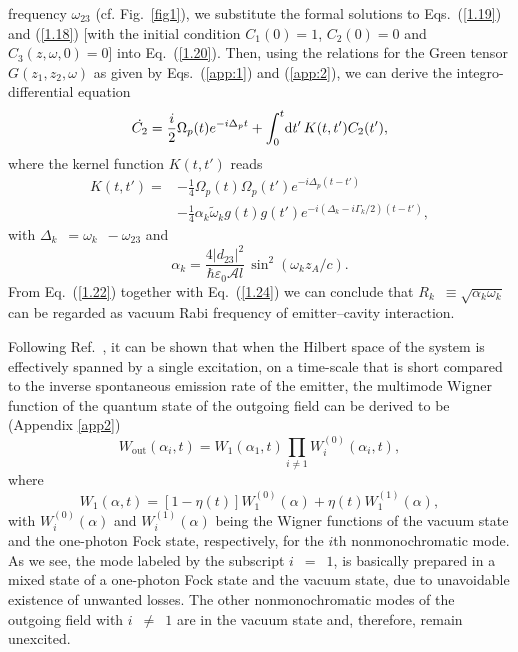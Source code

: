\documentclass[pra, twocolumn]{revtex4}
\newcommand{\D}{\mbox{\rm d}}
\begin{document}
frequency $\omega_{23}$
(cf. Fig.~\ref{fig1}),
we substitute the formal solutions to Eqs.~(\ref{1.19}) and (\ref{1.18})
[with the initial condition \mbox{$C_1(0)=1$}, \mbox{$C_2(0)=0$} and
\mbox{$C_3(z, \omega, 0)=0$}] into  Eq.~(\ref{1.20}).
%
Then, using
%
the
relations for the Green tensor $G(z_1, z_2, \omega)$
as given by
Eqs.~(\ref{app:1}) and (\ref{app:2}),
we can
derive the integro-differential equation
\begin{align}
 \label{1.22}
 \dot {C_2} =
 \frac{i}{2}
\Omega
_p(t)
      e^{-i\Delta_pt}
 +
\int_0^t \! \D t'\,
    K(t,t')
    C_2(t'),
\end{align}
where the kernel function $K(t,t')$ reads
\begin{align}
  \label{1.24}
  K(t,t')=
&
  -\frac{1}{4}
\Omega
_p(t)
\Omega
_p(t')
    e^{-i\Delta_p(t-t')}
\nonumber\\[1ex]&
    -
    \frac{1}{4}
   \alpha_k 
   \tilde{\omega}_k
   g(t)
    g(t')
    e^{-i(\Delta_k - i \Gamma_k/2)(t-t')},
\end{align}
with \mbox{$\Delta_k$ $\!=\omega_k$ $\!-\omega_{23}$} and
\begin{equation}
  \label{1.23}
   \alpha_k  =  \frac{4|d_{23}|^2 }
    {\hbar \varepsilon _0  \mathcal{A}
l}\,
    \sin^2
    (\omega_k
    z_A/c)
.
\end{equation}
From Eq.~(\ref{1.22}) together with Eq.~(\ref{1.24})
we can conclude
that
\mbox{$R_k$ $\!\equiv\sqrt{\alpha_k\omega_k}$}
can be
regarded as vacuum Rabi frequency of emitter--cavity interaction.

Following Ref.~\cite{khanbekyan:013822}, it can be shown that
when the Hilbert space of the system is
effectively spanned by a single excitation,
on a time-scale that is short compared to the inverse spontaneous
emission rate of the emitter,
the multimode Wigner function of the quantum state
of the outgoing field can be derived to be 
(Appendix \ref{app2})
\begin{equation}
\label{1.25}
W_{\mathrm{out}} (\alpha_i, t)
= W_1(\alpha_1,t)
\prod_{i\neq 1}
     W_i^{(0)}(\alpha _i, t),
\end{equation}
where
\begin{equation}
\label{1.27}
W_1(\alpha,t)
= [1-\eta(t)]W_1^{(0)}(\alpha)
     +\eta(t)W_1^{(1)}(\alpha),
\end{equation}
with $W_i^{(0)}(\alpha)$ and $W_i^{(1)}(\alpha)$
being the Wigner functions of the vacuum
state and the one-photon Fock state, respectively, for the
$i$th nonmonochromatic mode. As we see, the
mode labeled by the subscript \mbox{$i$ $\!=$
$\!1$},
is
basically
prepared
in a mixed state of a one-photon Fock state and the
vacuum state, due to
unavoidable existence of unwanted losses.
The other nonmonochromatic modes of the
outgoing field with \mbox{$i$ $\!\neq$ $\!1$} are in the vacuum
state and, therefore, remain unexcited.
\end{document}
